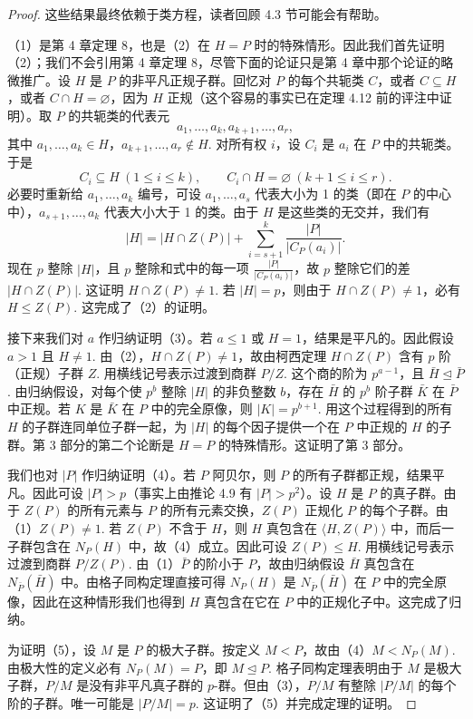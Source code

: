 \begin{proof}
这些结果最终依赖于类方程，读者回顾 4.3 节可能会有帮助。

（1）是第 4 章定理 8，也是（2）在 \(H = P\) 时的特殊情形。因此我们首先证明（2）；我们不会引用第 4 章定理 8，尽管下面的论证只是第 4 章中那个论证的略微推广。设 \(H\) 是 \(P\) 的非平凡正规子群。回忆对 \(P\) 的每个共轭类 \(C\)，或者 \(C \subseteq H\)，或者 \(C \cap H = \varnothing\)，因为 \(H\) 正规（这个容易的事实已在定理 4.12 前的评注中证明）。取 \(P\) 的共轭类的代表元
\[
a_1, \ldots, a_k, a_{k+1}, \ldots, a_r,
\]
其中 \(a_1, \ldots, a_k \in H\)，\(a_{k+1}, \ldots, a_r \notin H\). 对所有权 \(i\)，设 \(C_i\) 是 \(a_i\) 在 \(P\) 中的共轭类。于是
\[
C_i \subseteq H\ (1 \leq i \leq k), \qquad C_i \cap H = \varnothing\ (k+1 \leq i \leq r).
\]
必要时重新给 \(a_1, \ldots, a_k\) 编号，可设 \(a_1, \ldots, a_s\) 代表大小为 1 的类（即在 \(P\) 的中心中），\(a_{s+1}, \ldots, a_k\) 代表大小大于 1 的类。由于 \(H\) 是这些类的无交并，我们有
\[
|H| = |H \cap Z(P)| + \sum_{i=s+1}^{k} \frac{|P|}{|C_P(a_i)|}.
\]
现在 \(p\) 整除 \(|H|\)，且 \(p\) 整除和式中的每一项 \(\frac{|P|}{|C_P(a_i)|}\)，故 \(p\) 整除它们的差 \(|H \cap Z(P)|\). 这证明 \(H \cap Z(P) \neq 1\). 若 \(|H| = p\)，则由于 \(H \cap Z(P) \neq 1\)，必有 \(H \leq Z(P)\). 这完成了（2）的证明。

接下来我们对 \(a\) 作归纳证明（3）。若 \(a \leq 1\) 或 \(H = 1\)，结果是平凡的。因此假设 \(a > 1\) 且 \(H \neq 1\). 由（2），\(H \cap Z(P) \neq 1\)，故由柯西定理 \(H \cap Z(P)\) 含有 \(p\) 阶（正规）子群 \(Z\). 用横线记号表示过渡到商群 \(P/Z\). 这个商的阶为 \(p^{a-1}\)，且 \(\bar{H} \trianglelefteq \bar{P}\). 由归纳假设，对每个使 \(p^b\) 整除 \(|H|\) 的非负整数 \(b\)，存在 \(\bar{H}\) 的 \(p^b\) 阶子群 \(\bar{K}\) 在 \(\bar{P}\) 中正规。若 \(K\) 是 \(\bar{K}\) 在 \(P\) 中的完全原像，则 \(|K| = p^{b+1}\). 用这个过程得到的所有 \(H\) 的子群连同单位子群一起，为 \(|H|\) 的每个因子提供一个在 \(P\) 中正规的 \(H\) 的子群。第 3 部分的第二个论断是 \(H = P\) 的特殊情形。这证明了第 3 部分。

我们也对 \(|P|\) 作归纳证明（4）。若 \(P\) 阿贝尔，则 \(P\) 的所有子群都正规，结果平凡。因此可设 \(|P| > p\)（事实上由推论 4.9 有 \(|P| > p^2\)）。设 \(H\) 是 \(P\) 的真子群。由于 \(Z(P)\) 的所有元素与 \(P\) 的所有元素交换，\(Z(P)\) 正规化 \(P\) 的每个子群。由（1）\(Z(P) \neq 1\). 若 \(Z(P)\) 不含于 \(H\)，则 \(H\) 真包含在 \(\langle H, Z(P) \rangle\) 中，而后一子群包含在 \(N_P(H)\) 中，故（4）成立。因此可设 \(Z(P) \leq H\). 用横线记号表示过渡到商群 \(P/Z(P)\). 由（1）\(\bar{P}\) 的阶小于 \(P\)，故由归纳假设 \(\bar{H}\) 真包含在 \(N_{\bar{P}}(\bar{H})\) 中。由格子同构定理直接可得 \(N_P(H)\) 是 \(N_{\bar{P}}(\bar{H})\) 在 \(P\) 中的完全原像，因此在这种情形我们也得到 \(H\) 真包含在它在 \(P\) 中的正规化子中。这完成了归纳。

为证明（5），设 \(M\) 是 \(P\) 的极大子群。按定义 \(M < P\)，故由（4）\(M < N_P(M)\). 由极大性的定义必有 \(N_P(M) = P\)，即 \(M \trianglelefteq P\). 格子同构定理表明由于 \(M\) 是极大子群，\(P/M\) 是没有非平凡真子群的 \(p\)-群。但由（3），\(P/M\) 有整除 \(|P/M|\) 的每个阶的子群。唯一可能是 \(|P/M| = p\). 这证明了（5）并完成定理的证明。
\end{proof}

